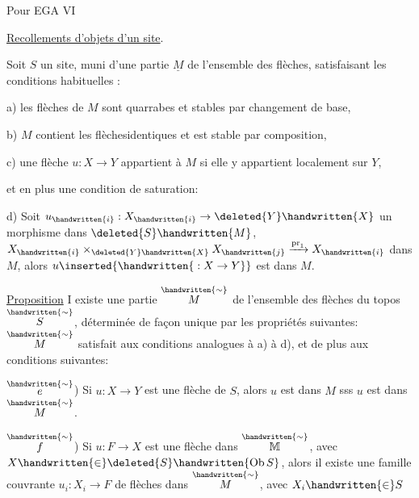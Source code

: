 Pour EGA VI

\uline{Recollements d'objets d'un site}.

Soit $S$ un site, muni d'une partie $\underline{M}$ de l'ensemble des flèches, satisfaisant les conditions habituelles :

a) les flèches de $M$ sont quarrabes et stables par changement de base,

b) $M$ contient les flèches\handwritten{\ensuremath{\vert}}identiques et est stable par composition,

c) une flèche $u:X\to Y$ appartient à $M$ si elle y appartient localement sur $Y$,

et en plus une condition de saturation:

d) Soit $u_{\handwritten{i}}:X_{\handwritten{i}}\to\deleted{Y}\handwritten{X}$ un morphisme dans $\deleted{S}\handwritten{M}$,  $X_{\handwritten{i}}\times_{\deleted{Y}\handwritten{X}}X_{\handwritten{j}}\xrightarrow{\mathrm{pr}_{1}}X_{\handwritten{i}}$ dans $M$\handwritten{)},  alors $u\inserted{\handwritten{{}:X\to Y}}$ est dans $M$.


\uline{Proposition} I existe une partie $\overset{\handwritten{\sim}}{M}$ de l'ensemble des flèches du topos $\overset{\handwritten{\sim}}{S}$, déterminée de façon unique par les propriétés suivantes: $\overset{\handwritten{\sim}}{M}$ satisfait aux conditions  analogues à a) à d), et de plus aux conditions suivantes:

$\overset{\handwritten{\sim}}{e}$) Si $u:X\to Y$ est une flèche de $S$, alors $u$ est dans $M$ sss $u$ est dans $\overset{\handwritten{\sim}}{M}$.

$\overset{\handwritten{\sim}}{f}$) Si $u:F\to X$ est une flèche dans $\overset{\handwritten{\sim}}{\mathbb{M}}$, avec $X\handwritten{\in}\deleted{S}\handwritten{\mathrm{Ob}\,S}$, alors il existe une famille couvrante $u_i:X_i\to F$ de flèches dans $\overset{\handwritten{\sim}}{M}$, avec $X_i\handwritten{\in}S$ 

